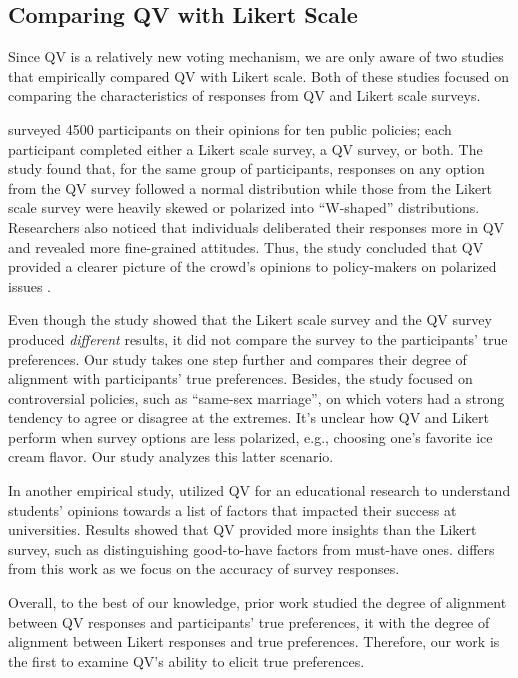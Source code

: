 \subsection{Comparing QV with Likert Scale}
Since QV is a relatively new voting mechanism, we are only aware of two studies that empirically compared QV with Likert scale. Both of these studies focused on comparing the characteristics of responses from QV and Likert scale surveys.

\textcite{quarfoot2017quadratic} surveyed 4500 participants on their opinions for ten public policies; each participant completed either a Likert scale survey, a QV survey, or both.  The study found that, for the same group of participants, responses on any option from the QV survey followed a normal distribution while those from the Likert scale survey were heavily skewed or polarized into ``W-shaped'' distributions. Researchers also noticed that individuals deliberated their responses more in QV and revealed more fine-grained attitudes. Thus, the study concluded that QV provided a clearer picture of the crowd's opinions to policy-makers on polarized issues \cite{quarfoot2017quadratic}. 

Even though the study showed that the Likert scale survey and the QV survey produced \textit{different} results, it did not compare the survey {} to the participants' true preferences. Our study takes one step further and compares their degree of alignment with participants' true preferences. Besides, the study focused on controversial policies, such as ``same-sex marriage'', on which voters had a strong tendency to agree or disagree at the extremes. It's unclear how QV and Likert perform when survey options are less polarized, e.g., choosing one's favorite ice cream flavor. Our study analyzes this latter scenario.

In another empirical study, \textcite{naylor2017first} utilized QV for an educational research to understand students' opinions towards a list of factors that impacted their success at universities. Results showed that QV provided more insights than the Likert survey, such as distinguishing good-to-have factors from must-have ones. {} differs from this work as we focus on {} the accuracy of survey responses.

Overall, to the best of our knowledge, prior work {} studied the degree of alignment between QV responses and participants' true preferences, {} it with the degree of alignment between Likert responses and true preferences. Therefore, our work is the first to examine QV's ability to elicit true preferences.
